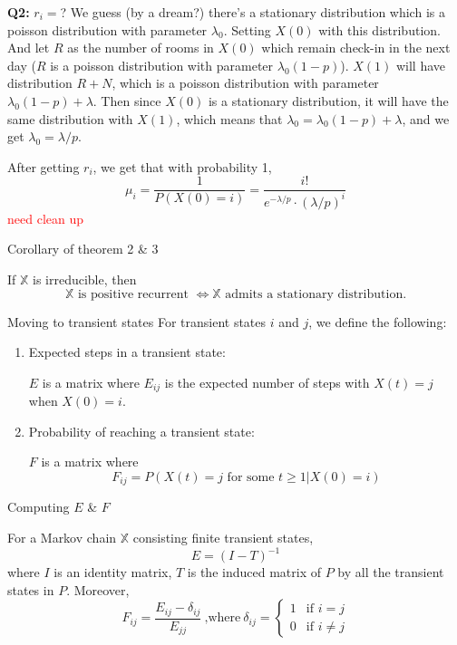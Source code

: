 \documentclass[mathserif]{beamer}
\begin{document}
\begin{frame}{\textbf{Q2:} $r_i =$?}
	We guess (by a dream?) there's a stationary distribution which is a poisson distribution with parameter $\lambda_0$.
	Setting $X(0)$ with this distribution. 
	And let $R$ as the number of rooms in $X(0)$ which remain check-in in the next day ($R$ is a poisson distribution with parameter $\lambda_0 (1-p)$).
	$X(1)$ will have distribution $R + N$, which is a poisson distribution with parameter $\lambda_0 (1-p) + \lambda$.
	Then since $X(0)$ is a stationary distribution, it will have the same distribution with $X(1)$, which means that $\lambda_0 = \lambda_0 (1-p) + \lambda$, and we get $\lambda_0 = \lambda / p$.
	
	After getting $r_i$, we get that with probability 1, 
	\[
	\mu_i = \frac{1}{P(X(0)=i)} = \frac{i!}{e^{-\lambda/p}\cdot (\lambda/p)^i}
	\]
	\textcolor{red}{need clean up}
\end{frame}

\begin{frame}{Corollary of theorem 2 \& 3}
\begin{corollary}
If $\mathbb{X}$ is irreducible, then
\[
\text{$\mathbb{X}$ is positive recurrent $\iff \mathbb{X}$ admits a stationary distribution.}
\]
\end{corollary}
\end{frame}

\begin{frame}{Moving to transient states}
For transient states $i$ and $j$, we define the following:
\begin{enumerate}
\item Expected steps in a transient state:
	\begin{definition}
	$E$ is a matrix where $E_{ij}$ is the expected number of steps with $X(t) = j$ when $X(0)=i$.
	\end{definition}
\item Probability of reaching a transient state:
	\begin{definition}
	$F$ is a matrix where
	\[
	F_{ij} = P(X(t)=j \text{ for some } t \geq 1 | X(0)=i)
	\]
	\end{definition}
\end{enumerate}
\end{frame}

\begin{frame}{Computing $E$ \& $F$}
\begin{theorem}
For a Markov chain $\mathbb{X}$ consisting finite transient states,
\[
E = (I - T)^{-1}
\]
where $I$ is an identity matrix, $T$ is the induced matrix of $P$ by all the transient states in $P$.
Moreover,
\[
F_{ij} = \frac{E_{ij} - \delta_{ij}}{E_{jj}} ~\text{,where}~ \delta_{ij}=
\begin{cases}
1 & \text{if } i=j \\
0 & \text{if } i \neq j
\end{cases}
\]
\end{theorem}
\end{frame}
\end{document}
